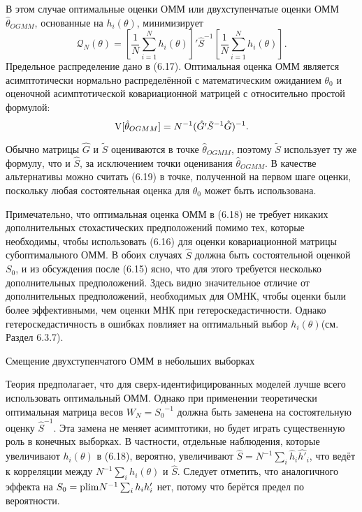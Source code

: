 В этом случае оптимальные оценки ОММ или двухступенчатые оценки ОММ $\hat{\theta}_{OGMM}$, основанные на $h_i(\theta)$, минимизирует
\begin{equation}
\mathcal{Q}_{N}(\theta)=\left[ \frac{1}{N} \sum_{i=1}^{N} h_i(\theta) \right]' {\hat{S}}^{-1}  \left[ \frac{1}{N} \sum_{i=1}^{N} h_i(\theta) \right].
\end{equation}
Предельное распределение дано в (6.17). Оптимальная оценка ОММ является асимптотически нормально распределённой с математическим ожиданием $\theta_0$ и оценочной асимптотической ковариационной матрицей с относительно простой формулой:
\begin{equation}
\mathrm{V}[\hat{\theta}_{OGMM}]=N^{-1}(\hat{G'} {\tilde{S}}^{-1} \hat{G})^{-1}.
\end{equation}

Обычно матрицы $\hat{G}$ и $\tilde{S}$ оцениваются в точке $\hat{\theta}_{OGMM}$, поэтому $\tilde{S}$ использует ту же формулу, что и $\hat{S}$, за исключением точки оценивания $\hat{\theta}_{OGMM}$. В качестве альтернативы можно считать (6.19) в точке, полученной на первом шаге оценки, поскольку любая состоятельная оценка для $\theta_0$ может быть использована.

Примечательно, что оптимальная оценка ОММ в (6.18) не требует никаких дополнительных стохастических предположений помимо тех, которые необходимы, чтобы использовать (6.16) для оценки ковариационной матрицы субоптимального ОММ. В обоих случаях $\hat{S}$ должна быть состоятельной оценкой $S_0$, и из обсуждения после (6.15) ясно, что для этого требуется несколько дополнительных предположений. Здесь видно значительное отличие от дополнительных предположений, необходимых для ОМНК, чтобы оценки были более эффективными, чем оценки МНК при гетероскедастичности. Однако гетероскедастичность в ошибках повлияет на оптимальный выбор $h_i(\theta)$(см. Раздел 6.3.7).

\begin{center}
Смещение двухступенчатого ОММ в небольших выборках 
\end{center}

Теория предполагает, что для сверх-идентифицированных моделей лучше всего использовать оптимальный ОММ. Однако при применении теоретически оптимальная матрица весов $W_N={S_0}^{-1}$ должна быть заменена на состоятельную оценку ${\hat{S}}^{-1}$. Эта замена не меняет асимптотики, но будет играть существенную роль в конечных выборках. В частности, отдельные наблюдения, которые увеличивают $h_i(\theta)$ в (6.18), вероятно, увеличивают $\hat{S}=N^{-1} \sum_i \hat{h}_i \hat{h'}_i$, что ведёт к корреляции между $N^{-1} \sum_i h_i(\theta)$ и $\hat{S}$. Следует отметить, что аналогичного эффекта на $S_0=\mathrm{plim } N^{-1} \sum_i h_i h'_i$ нет, потому что берётся предел по вероятности.


